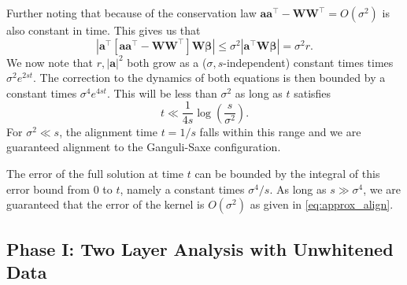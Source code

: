 \documentclass{article} %
\begin{document}
\begin{appendix}
Further noting that because of the conservation law $\bm a \bm a^\top - \bm W \bm W^\top = O(\sigma^2)$ is also constant in time. This gives us that
\begin{equation}
    | \bm a^\top [\bm a \bm a^\top - \bm W \bm W^\top] \bm W \bm \beta | \leq \sigma^2 | \bm a^\top\bm W \bm \beta | = \sigma^2 r.
\end{equation}
We now note that $r, |\bm a|^2$ both grow as a ($\sigma, s$-independent) constant times  times $\sigma^2 e^{2 s t}$. The correction to the dynamics of both equations is then bounded by a constant times $\sigma^4 e^{4 s t}$.
This will be less than $\sigma^2$ as long as $t$ satisfies
\begin{equation}
    t \ll \frac{1}{4 s} \log \left( \frac{s}{\sigma^2} \right).
\end{equation}
For $\sigma^2 \ll s$, the alignment time $t=1/s$ falls within this range and we are guaranteed alignment to the Ganguli-Saxe configuration.

The error of the full solution at time $t$ can be bounded by the integral of this error bound from $0$ to $t$, namely a constant times $\sigma^4/ s$. As long as $s \gg \sigma^4$, we are guaranteed that the error of the kernel is $O(\sigma^2)$ as given in \eqref{eq:approx_align}.


\subsection{Phase I: Two Layer Analysis with Unwhitened Data}\label{app:two_layer_unwhitened} 


\end{appendix}
\end{document}
